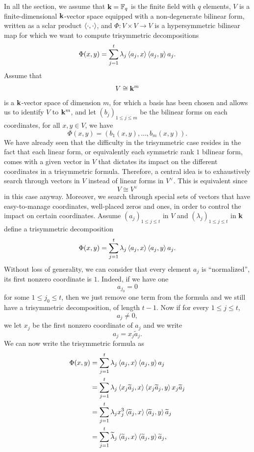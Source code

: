 In all the section, we assume that $\mathbf{k}=\mathbb{F}_q$ is the finite field with
$q$ elements, $V$ is a finite-dimensional $\mathbf{k}$-vector space equipped with a
non-degenerate bilinear form, written as a sclar product $\left\langle\cdot,\cdot\right\rangle$,
and $\Phi:V\times V\to V$ is a hypersymmetric bilinear map for which we want to
compute trisymmetric decompositions
\[
  \Phi(x, y) = \sum_{j=1}^t\lambda_j\left\langle a_j,x\right\rangle\left\langle a_j,y\right\rangle a_j.
\]
Assume that
\[
  V\cong\mathbf{k}^m
\]
is a $\mathbf{k}$-vector space of dimension $m$, for which a basis has been chosen and
allows us to identify $V$ to $\mathbf{k}^m$, and
let $(b_j)_{1\leq j\leq m}$ be the bilinear forms on each coordinates, \ie for
all $x,y\in V$, we have
\[
  \Phi(x, y) = (b_1(x, y), \dots, b_m(x, y)).
\]
We have already seen that the difficulty in the trisymmetric case resides in the
fact that each linear form, or equivalently each symmetric rank $1$ bilinear
form, comes with a given vector in $V$ that dictates its impact on the different
coordinates in a trisymmetric formula. Therefore, a central idea is to
exhaustively search through vectors in $V$ instead of linear forms in $V^\vee$.
This is equivalent since 
\[
  V\cong V^\vee
\]
in this case anyway. Moreover, we search through special sets of vectors that
have easy-to-manage coordinates, \eg well-placed zeros and ones, in order to
control the impact on certain coordinates. Assume $(a_j)_{1\leq j \leq t}$ in $V$ and
$(\lambda_j)_{1\leq j \leq t}$ in $\mathbf{k}$ define a trisymmetric decomposition
\[
  \Phi(x, y) = \sum_{j=1}^t\lambda_j\left\langle a_j,x\right\rangle\left\langle a_j,y\right\rangle a_j.
\]
Without loss of generality, we can consider that every element $a_j$ is
``normalized'', \ie its first nonzero coordinate is $1$. Indeed, if we have one
\[
  a_{j_0} = 0
\]
for some $1\leq j_0 \leq t$, then we just remove one term from the formula and
we still have a trisymmetric decomposition, of length $t-1$. Now if for every
$1\leq j\leq t$, 
\[
  a_j\neq0,
\]
we let $x_j$ be the first nonzero coordinate of $a_j$ and we write
\[
  a_j = x_j \widetilde a_j.
\]
We can now write the trisymmetric formula as
\begin{align*}
  \Phi(x, y) &= \sum_{j=1}^t\lambda_j\left\langle a_j,x\right\rangle\left\langle a_j,y\right\rangle a_j \\
  &= \sum_{j=1}^t\lambda_j\left\langle x_j\widetilde a_j,x\right\rangle\left\langle x_j\widetilde
  a_j,y\right\rangle x_j\widetilde a_j \\
  &= \sum_{j=1}^t\lambda_jx_j^3\left\langle\widetilde a_j,x\right\rangle\left\langle\widetilde
  a_j,y\right\rangle\widetilde a_j \\
  &= \sum_{j=1}^t\widetilde \lambda_j\left\langle\widetilde a_j,x\right\rangle\left\langle\widetilde
  a_j,y\right\rangle\widetilde a_j,
\end{align*}

